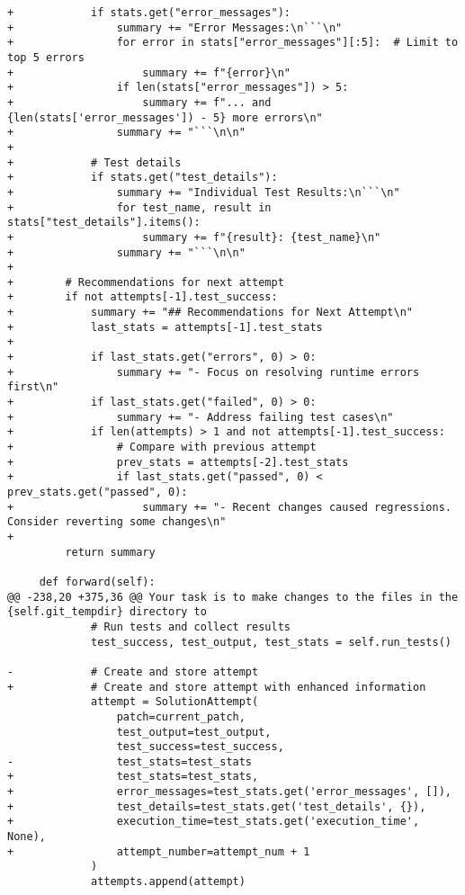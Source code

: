 \begin{lstlisting}[style=diffstyle]
+            if stats.get("error_messages"):
+                summary += "Error Messages:\n```\n"
+                for error in stats["error_messages"][:5]:  # Limit to top 5 errors
+                    summary += f"{error}\n"
+                if len(stats["error_messages"]) > 5:
+                    summary += f"... and {len(stats['error_messages']) - 5} more errors\n"
+                summary += "```\n\n"
+            
+            # Test details
+            if stats.get("test_details"):
+                summary += "Individual Test Results:\n```\n"
+                for test_name, result in stats["test_details"].items():
+                    summary += f"{result}: {test_name}\n"
+                summary += "```\n\n"
+
+        # Recommendations for next attempt
+        if not attempts[-1].test_success:
+            summary += "## Recommendations for Next Attempt\n"
+            last_stats = attempts[-1].test_stats
+            
+            if last_stats.get("errors", 0) > 0:
+                summary += "- Focus on resolving runtime errors first\n"
+            if last_stats.get("failed", 0) > 0:
+                summary += "- Address failing test cases\n"
+            if len(attempts) > 1 and not attempts[-1].test_success:
+                # Compare with previous attempt
+                prev_stats = attempts[-2].test_stats
+                if last_stats.get("passed", 0) < prev_stats.get("passed", 0):
+                    summary += "- Recent changes caused regressions. Consider reverting some changes\n"
+            
         return summary
 
     def forward(self):
@@ -238,20 +375,36 @@ Your task is to make changes to the files in the {self.git_tempdir} directory to
             # Run tests and collect results 
             test_success, test_output, test_stats = self.run_tests()
             
-            # Create and store attempt
+            # Create and store attempt with enhanced information
             attempt = SolutionAttempt(
                 patch=current_patch,
                 test_output=test_output,
                 test_success=test_success,
-                test_stats=test_stats
+                test_stats=test_stats,
+                error_messages=test_stats.get('error_messages', []),
+                test_details=test_stats.get('test_details', {}),
+                execution_time=test_stats.get('execution_time', None),
+                attempt_number=attempt_num + 1
             )
             attempts.append(attempt)
             

\end{lstlisting}

